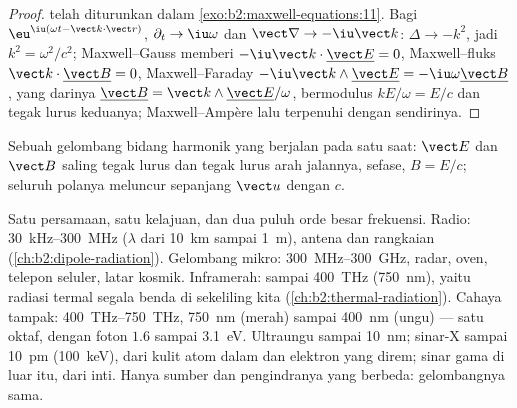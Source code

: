 \begin{proof}
 telah diturunkan dalam \cref{exo:b2:maxwell-equations:11}.
Bagi $\eu^{\iu(\omega t - \vect k\cdot\vect r)}$, $\partial_t \to \iu\omega$ dan $\vect\nabla \to
-\iu\vect k$: $\Delta \to -k^2$, jadi $k^2 = \omega^2/c^2$; Maxwell--Gauss memberi $-\iu
\vect k\cdot\underline{\vect E} = 0$, Maxwell--fluks $\vect k\cdot\underline{\vect B} = 0$,
Maxwell--Faraday $-\iu\vect k\wedge\underline{\vect E} = -\iu\omega\underline{\vect B}$, yang darinya
$\underline{\vect B} = \vect k\wedge\underline{\vect E}/\omega$, bermodulus $kE/\omega = E/c$ dan
tegak lurus keduanya; Maxwell--Ampère lalu terpenuhi dengan sendirinya.
\end{proof}

\begin{omfigure}

{\small Sebuah gelombang bidang harmonik yang berjalan pada satu saat: $\vect E$ dan
$\vect B$ saling tegak lurus dan tegak lurus arah jalannya, sefase,
$B = E/c$; seluruh polanya meluncur sepanjang $\vect u$ dengan $c$.}
\end{omfigure}

\begin{remark}[Spektrumnya]\label{rem:b2:plane-waves-polarization:spectrum}
Satu persamaan, satu kelajuan, dan dua puluh orde besar frekuensi.
Radio: \qty{30}{kHz}--\qty{300}{MHz} ($\lambda$ dari \qty{10}{km} sampai \qty{1}{m}),
antena dan rangkaian (\cref{ch:b2:dipole-radiation}). Gelombang mikro:
\qty{300}{MHz}--\qty{300}{GHz}, radar, oven, telepon seluler, latar
kosmik. Inframerah: sampai \qty{400}{THz} (\qty{750}{nm}), yaitu radiasi
termal segala benda di sekeliling kita (\cref{ch:b2:thermal-radiation}).
Cahaya tampak: \qty{400}{THz}--\qty{750}{THz}, \qty{750}{nm} (merah) sampai \qty{400}{nm}
(ungu) --- satu oktaf, dengan foton $1.6$ sampai \qty{3.1}{eV}. Ultraungu sampai
\qty{10}{nm}; sinar-X sampai \qty{10}{pm} (\qty{100}{keV}), dari kulit atom dalam
dan elektron yang direm; sinar gama di luar itu, dari inti. Hanya sumber
dan pengindranya yang berbeda: gelombangnya sama.
\end{remark}

